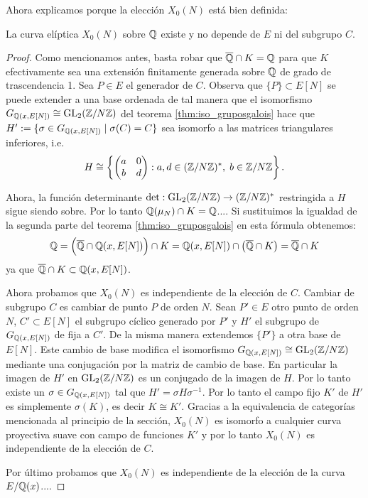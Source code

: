 \documentclass[../../tesis_maestria]{subfiles}
\begin{document}
Ahora explicamos porque la elecci\'on $X_0(N)$ est\'a bien definida:

\begin{cor}
  La curva el\'iptica $X_0(N)$ sobre $\mathbb{Q}$ existe y no depende de $E$ ni del subgrupo $C$.
\end{cor}

\begin{proof}
  Como mencionamos antes, basta robar que $\overline{\mathbb{Q}}\cap K=\mathbb{Q}$ para que $K$ efectivamente
  sea una extensi\'on finitamente generada sobre $\mathbb{Q}$ de grado de trascendencia 1. Sea $P\in E$
  el generador de $C$. Observa que $\{P\}\subset E[N]$ se puede extender a una base ordenada de
  tal manera que el isomorfismo $G_{\mathbb{Q}(x,E[N])}\cong\mathrm{GL}_2(\mathbb{Z}/N\mathbb{Z})$ del teorema
  \ref{thm:iso_gruposgalois} hace que $H':=\{\sigma\in G_{\mathbb{Q}(x,E[N])}\mid \sigma(C)=C\}$ sea
  isomorfo a las matrices triangulares inferiores, i.e.
  \[
    H\cong\left\{ \begin{pmatrix}a&0\\b&d\end{pmatrix}:a,d\in(\mathbb{Z}/N\mathbb{Z})^{*},\; b\in\mathbb{Z}/N\mathbb{Z}\right\}.
  \]
  
  Ahora, la funci\'on determinante $\det:\mathrm{GL}_2(\mathbb{Z}/N\mathbb{Z})\rightarrow(\mathbb{Z}/N\mathbb{Z})^*$ restringida a $H$ sigue
  siendo sobre. Por lo tanto $\mathbb{Q}(\mu_N)\cap K=\mathbb{Q}$....
  Si sustituimos la igualdad de la segunda parte del teorema \ref{thm:iso_gruposgalois} en esta
  f\'ormula obtenemos:
  \[
    \mathbb{Q}=
    \Big(\overline{\mathbb{Q}}\cap\mathbb{Q}(x,E[N])\Big)\cap K=
    \mathbb{Q}(x,E[N])\cap \big(\overline{\mathbb{Q}}\cap K\big)=\overline{\mathbb{Q}}\cap K
  \]
  ya que $\overline{\mathbb{Q}}\cap K\subset\mathbb{Q}(x,E[N])$.

  Ahora probamos que $X_0(N)$ es independiente de la elecci\'on de $C$. Cambiar de subgrupo $C$ es
  cambiar de punto $P$ de orden $N$. Sean $P'\in E$ otro punto de orden $N$, $C'\subset E[N]$ el
  subgrupo c\'iclico generado por $P'$ y $H'$ el subgrupo de $G_{\mathbb{Q}(x,E[N])}$ de fija a $C'$. De la
  misma manera extendemos $\{P'\}$ a otra base de $E[N]$. Este cambio de base modifica el
  isomorfismo $G_{\mathbb{Q}(x,E[N])}\cong\mathrm{GL}_2(\mathbb{Z}/N\mathbb{Z})$ mediante una conjugaci\'on por la matriz de cambio
  de base. En particular la imagen de $H'$ en $\mathrm{GL}_2(\mathbb{Z}/N\mathbb{Z})$ es un conjugado de la imagen de $H$.
  Por lo tanto existe un $\sigma\in G_{\mathbb{Q}(x,E[N])}$ tal que $H'=\sigma H\sigma^{-1}$. Por lo tanto
  el campo fijo $K'$ de $H'$ es simplemente $\sigma(K)$, es decir $K\cong K'$. Gracias a la
  equivalencia de categor\'ias mencionada al principio de la secci\'on, $X_0(N)$ es isomorfo a
  cualquier curva proyectiva suave con campo de funciones $K'$ y por lo tanto $X_0(N)$ es
  independiente de la elecci\'on de $C$.

  Por \'ultimo probamos que $X_0(N)$ es independiente de la elecci\'on de la curva $E/\mathbb{Q}(x)$....  
\end{proof}
\end{document}
